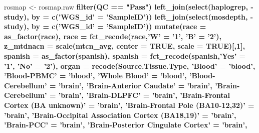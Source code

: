 \documentclass[]{book}
\newenvironment{Shaded}{\begin{snugshade}}{\end{snugshade}}
\newcommand{\DataTypeTok}[1]{\textcolor[rgb]{0.13,0.29,0.53}{#1}}
\newcommand{\DecValTok}[1]{\textcolor[rgb]{0.00,0.00,0.81}{#1}}
\newcommand{\KeywordTok}[1]{\textcolor[rgb]{0.13,0.29,0.53}{\textbf{#1}}}
\newcommand{\NormalTok}[1]{#1}
\newcommand{\OperatorTok}[1]{\textcolor[rgb]{0.81,0.36,0.00}{\textbf{#1}}}
\newcommand{\OtherTok}[1]{\textcolor[rgb]{0.56,0.35,0.01}{#1}}
\newcommand{\StringTok}[1]{\textcolor[rgb]{0.31,0.60,0.02}{#1}}
\begin{document}
\begin{Shaded}
\begin{Highlighting}[]
{{{{{\NormalTok{rosmap <-}\StringTok{ }\NormalTok{rosmap.raw }\OperatorTok{%>%}
\StringTok{  }\KeywordTok{filter}\NormalTok{(QC }\OperatorTok{==}\StringTok{ "Pass"}\NormalTok{) }\OperatorTok{%>%}
\StringTok{  }\KeywordTok{left_join}\NormalTok{(}\KeywordTok{select}\NormalTok{(haplogrep, }\OperatorTok{-}\NormalTok{study), }\DataTypeTok{by =} \KeywordTok{c}\NormalTok{(}\StringTok{'WGS_id'}\NormalTok{ =}\StringTok{ 'SampleID'}\NormalTok{)) }\OperatorTok{%>%}
\StringTok{  }\KeywordTok{left_join}\NormalTok{(}\KeywordTok{select}\NormalTok{(mosdepth, }\OperatorTok{-}\NormalTok{study), }\DataTypeTok{by =} \KeywordTok{c}\NormalTok{(}\StringTok{'WGS_id'}\NormalTok{ =}\StringTok{ 'SampleID'}\NormalTok{)) }\OperatorTok{%>%}
\StringTok{    }\KeywordTok{mutate}\NormalTok{(}\DataTypeTok{race =} \KeywordTok{as_factor}\NormalTok{(race),}
        \DataTypeTok{race =} \KeywordTok{fct_recode}\NormalTok{(race,}\StringTok{'W'}\NormalTok{ =}\StringTok{ '1'}\NormalTok{, }\StringTok{'B'}\NormalTok{ =}\StringTok{ '2'}\NormalTok{),}
        \DataTypeTok{z_mtdnacn =} \KeywordTok{scale}\NormalTok{(mtcn_avg, }\DataTypeTok{center =} \OtherTok{TRUE}\NormalTok{, }\DataTypeTok{scale =} \OtherTok{TRUE}\NormalTok{)[,}\DecValTok{1}\NormalTok{],}
        \DataTypeTok{spanish =} \KeywordTok{as_factor}\NormalTok{(spanish),}
        \DataTypeTok{spanish =} \KeywordTok{fct_recode}\NormalTok{(spanish,}\StringTok{'Yes'}\NormalTok{ =}\StringTok{ '1'}\NormalTok{, }\StringTok{'No'}\NormalTok{ =}\StringTok{ '2'}\NormalTok{),}
        \DataTypeTok{organ =} \KeywordTok{recode}\NormalTok{(Source.Tissue.Type, }\StringTok{'Blood'}\NormalTok{ =}\StringTok{ 'blood'}\NormalTok{, }\StringTok{'Blood-PBMC'}\NormalTok{ =}\StringTok{ 'blood'}\NormalTok{, }\StringTok{'Whole Blood'}\NormalTok{ =}\StringTok{ 'blood'}\NormalTok{, }
                       \StringTok{'Blood-Cerebellum'}\NormalTok{ =}\StringTok{ 'brain'}\NormalTok{,  }\StringTok{'Brain-Anterior Caudate'}\NormalTok{ =}\StringTok{ 'brain'}\NormalTok{,}
                       \StringTok{'Brain-Cerebellum'}\NormalTok{ =}\StringTok{ 'brain'}\NormalTok{, }\StringTok{'Brain-DLPFC'}\NormalTok{ =}\StringTok{ 'brain'}\NormalTok{, }
                       \StringTok{'Brain-Frontal Cortex (BA unknown)'}\NormalTok{ =}\StringTok{ 'brain'}\NormalTok{, }
                       \StringTok{'Brain-Frontal Pole (BA10-12,32)'}\NormalTok{ =}\StringTok{ 'brain'}\NormalTok{, }
                       \StringTok{'Brain-Occipital Association Cortex (BA18,19)'}\NormalTok{ =}\StringTok{ 'brain'}\NormalTok{, }
                       \StringTok{'Brain-PCC'}\NormalTok{ =}\StringTok{ 'brain'}\NormalTok{, }\StringTok{'Brain-Posterior Cingulate Cortex'}\NormalTok{ =}\StringTok{ 'brain'}\NormalTok{, }
}}}}}}}}}
\end{Highlighting}
\end{Shaded}
\end{document}
